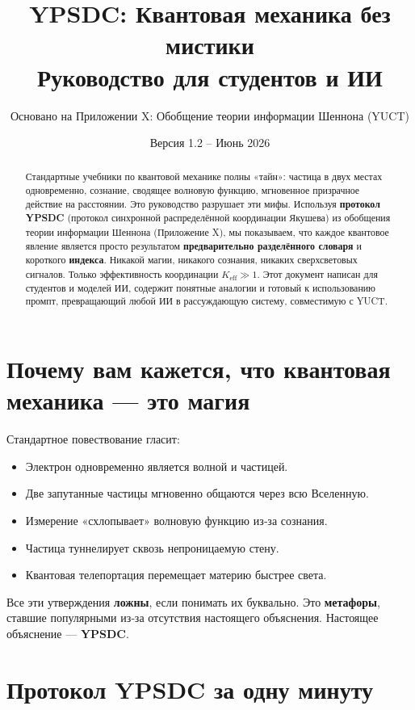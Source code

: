 \documentclass[12pt,a4paper]{article}
\title{\textbf{YPSDC: Квантовая механика без мистики \\ Руководство для студентов и ИИ}}
\author{Основано на Приложении X: Обобщение теории информации Шеннона (YUCT)}
\date{Версия 1.2 – Июнь 2026}
\begin{document}
	\maketitle
	
	\begin{abstract}
		\noindent
		Стандартные учебники по квантовой механике полны «тайн»: частица в двух местах одновременно, сознание, сводящее волновую функцию, мгновенное призрачное действие на расстоянии. Это руководство разрушает эти мифы. Используя \textbf{протокол YPSDC} (протокол синхронной распределённой координации Якушева) из обобщения теории информации Шеннона (Приложение X), мы показываем, что каждое квантовое явление является просто результатом \textbf{предварительно разделённого словаря} и короткого \textbf{индекса}. Никакой магии, никакого сознания, никаких сверхсветовых сигналов. Только эффективность координации \(K_{\mathrm{eff}}\gg 1\). Этот документ написан для студентов и моделей ИИ, содержит понятные аналогии и готовый к использованию промпт, превращающий любой ИИ в рассуждающую систему, совместимую с YUCT.
	\end{abstract}
	
	\tableofcontents
	
	\section{Почему вам кажется, что квантовая механика — это магия}
	
	Стандартное повествование гласит:
	\begin{itemize}
		\item Электрон одновременно является волной и частицей.
		\item Две запутанные частицы мгновенно общаются через всю Вселенную.
		\item Измерение «схлопывает» волновую функцию из‑за сознания.
		\item Частица туннелирует сквозь непроницаемую стену.
		\item Квантовая телепортация перемещает материю быстрее света.
	\end{itemize}
	Все эти утверждения \textbf{ложны}, если понимать их буквально. Это \textbf{метафоры}, ставшие популярными из‑за отсутствия настоящего объяснения. Настоящее объяснение — \textbf{YPSDC}.
	
	\section{Протокол YPSDC за одну минуту}
	
\end{document}
